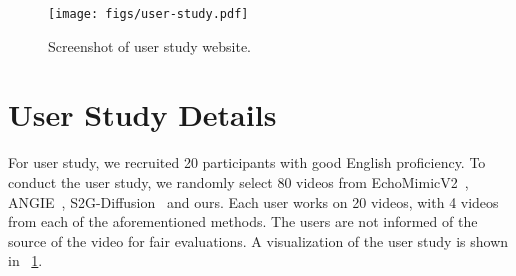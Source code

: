 \begin{table}[!ht]
\centering

\caption{\small{\textbf{Resource consumption comparison} with Stable-Diffusion-based Image-Animation models (1 NVIDIA A100 GPU), * means our re-implementation on PATS dataset.}}
\label{tab:consumption-sd}
\begin{center}
\end{center}
\vspace{-0.2cm}
\label{table_run_time}
\end{table}


\begin{figure}
    \vspace{-1em}
    \texttt{[image: figs/user-study.pdf]}
    \vspace{-1em}
    \caption{\small{Screenshot of user study website.}}
    \vspace{-5mm}
    \label{fig:user_study}
\end{figure}



\section{User Study Details}
\label{sec:sub_user}
For user study, we recruited 20 participants with good English proficiency. To conduct the user study, we randomly select 80 videos from EchoMimicV2~\cite{meng2024echomimic}, ANGIE~\cite{angie}, S2G-Diffusion~\cite{s2gdiffusion} and ours. Each user works on 20 videos, with 4 videos from each of the aforementioned methods. The users are not informed of the source of the video for fair evaluations. A visualization of the user study is shown in ~\cref{fig:user_study}.



